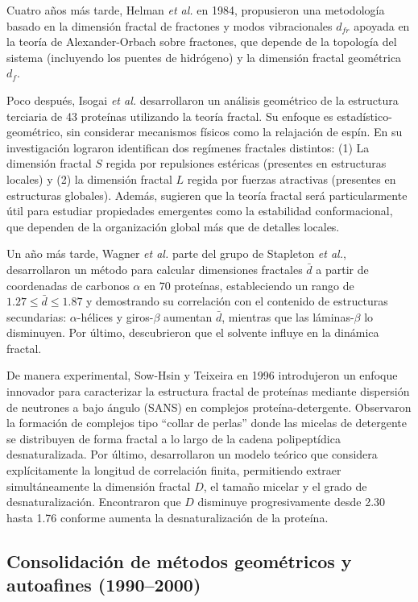 Cuatro años más tarde, Helman \textit{et al.}\cite{Helman1984} en 1984, propusieron una metodología basado en la dimensión fractal de fractones y modos vibracionales $d_{fr}$ apoyada en la teoría de Alexander-Orbach \cite{Alexander1982} sobre fractones, que depende de la topología del sistema (incluyendo los puentes de hidrógeno) y la dimensión fractal geométrica $d_f$.

Poco después, Isogai \textit{et al.} \cite{Isogai1984} desarrollaron un análisis geométrico de la estructura terciaria de 43 proteínas utilizando la teoría fractal. Su enfoque es estadístico-geométrico, sin considerar mecanismos físicos como la relajación de espín.
En su investigación lograron identifican dos regímenes fractales distintos: (1) La dimensión fractal $S$ regida por repulsiones estéricas (presentes en estructuras locales) y (2) la dimensión fractal $L$ regida por fuerzas atractivas (presentes en estructuras globales). Además, sugieren que la teoría fractal será particularmente útil para estudiar propiedades emergentes como la estabilidad conformacional, que dependen de la organización global más que de detalles locales.

Un año más tarde, Wagner \textit{et al.} \cite{Wagner1985} parte  del grupo de Stapleton \textit{et al.}, desarrollaron un método para calcular dimensiones fractales $\bar{d}$ a partir de coordenadas de carbonos $\alpha$ en 70 proteínas, estableciendo un rango de $1.27 \leq \bar{d} \leq 1.87$ y demostrando su correlación con el contenido de estructuras secundarias: $\alpha$-hélices y giros-$\beta$ aumentan $\bar{d}$, mientras que las láminas-$\beta$ lo disminuyen. Por último, descubrieron que el solvente influye en la dinámica fractal.

De manera experimental, Sow-Hsin y Teixeira \cite{Chen1986} en 1996 introdujeron un enfoque innovador para caracterizar la estructura fractal de proteínas mediante dispersión de neutrones a bajo ángulo (SANS) en complejos proteína-detergente. Observaron la formación de complejos tipo ``collar de perlas'' donde las micelas de detergente se distribuyen de forma fractal a lo largo de la cadena polipeptídica desnaturalizada. Por último, desarrollaron un modelo teórico que considera explícitamente la longitud de correlación finita, permitiendo extraer simultáneamente la dimensión fractal $D$, el tamaño micelar y el grado de desnaturalización. Encontraron que $D$ disminuye progresivamente desde 2.30 hasta 1.76 conforme aumenta la desnaturalización de la proteína.

\subsection{Consolidación de métodos geométricos y autoafines (1990--2000)}


